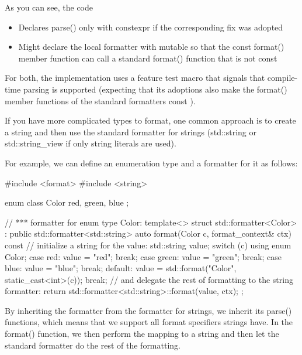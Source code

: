 As you can see, the code

\begin{itemize}
\item
Declares parse() only with constexpr if the corresponding fix was adopted

\item
Might declare the local formatter with mutable so that the const format() member function can call a standard format() function that is not const
\end{itemize}

For both, the implementation uses a feature test macro that signals that compile-time parsing is supported (expecting that its adoptions also make the format() member functions of the standard formatters const ).


If you have more complicated types to format, one common approach is to create a string and then use the standard formatter for strings (std::string or std::string\_view if only string literals are used).

For example, we can define an enumeration type and a formatter for it as follows:


\begin{cpp}
#include <format>
#include <string>

enum class Color { red, green, blue };

// *** formatter for enum type Color:
template<>
struct std::formatter<Color> : public std::formatter<std::string>
{
	auto format(Color c, format_context& ctx) const {
		// initialize a string for the value:
		std::string value;
		switch (c) {
			using enum Color;
			case red:
				value = "red";
				break;
			case green:
				value = "green";
				break;
			case blue:
				value = "blue";
				break;
			default:
				value = std::format("Color{}", static_cast<int>(c));
				break;
		}
		// and delegate the rest of formatting to the string formatter:
		return std::formatter<std::string>::format(value, ctx);
	}
};
\end{cpp}

By inheriting the formatter from the formatter for strings, we inherit its parse() functions, which means that we support all format specifiers strings have. In the format() function, we then perform the mapping to a string and then let the standard formatter do the rest of the formatting.

